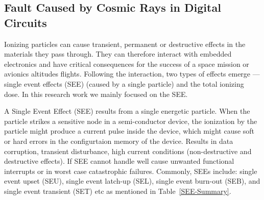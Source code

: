 \subsection{Fault Caused by Cosmic Rays in Digital Circuits}


Ionizing particles can cause transient, permanent or destructive effects in the materials they pass through. They can therefore interact with embedded electronics and have critical consequences for the success of a space mission or avionics altitudes flights. Following the interaction, two types of effects emerge ---
single event effects (SEE) (caused by a single particle) and the total ionizing dose. In this research work we mainly focused on the SEE.


A Single Event Effect (SEE) results from a single energetic particle. When the particle strikes a sensitive node in a semi-conductor device, the ionization by the particle might produce a current pulse inside the device, which might cause soft or hard errors in the configurtaion memory of the device. Results in data corruption, transient disturbance, high current conditions (non-destructive and destructive
effects). If SEE cannot handle well cause unwanted functional interrupts or in worst case catastrophic failures. Commonly, SEEs include: single event upset (SEU), single event latch-up (SEL), single event burn-out (SEB), and single event transient (SET) etc as mentioned in Table~\ref{SEE-Summary}. 


